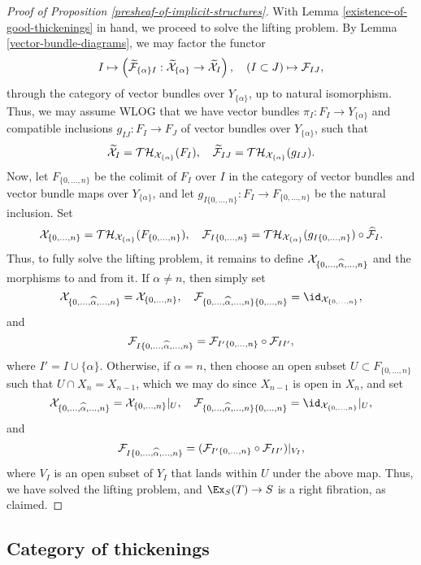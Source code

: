 \begin{proof}[Proof of Proposition \ref{presheaf-of-implicit-structures}]
With Lemma \ref{existence-of-good-thickenings} in hand, we proceed to solve the lifting problem. By Lemma \ref{vector-bundle-diagrams}, we may factor the functor
\[ I \mapsto \left( \widetilde {\mathcal F}_{\{\alpha\} I}: \widetilde {\mathcal X}_{\{\alpha\}} \to \widetilde {\mathcal X}_I \right), \quad \left( I \subset J \right) \mapsto \mathcal F_{I J}, \]
through the category of vector bundles over $Y_{\{\alpha\}}$, up to natural isomorphism. Thus, we may assume WLOG that we have vector bundles $\pi_I: F_I \to Y_{\{\alpha\}}$ and compatible inclusions $g_{I J} : F_I \to F_J$ of vector bundles over $Y_{\{\alpha\}}$, such that
\[ \widetilde {\mathcal X}_I = {\mathcal T \mathcal H}_{\mathcal X_{\{\alpha\}}}(F_I), \quad  \widetilde {\mathcal F}_{IJ} = {\mathcal T \mathcal H}_{\mathcal X_{\{\alpha\}}}(g_{IJ}). \]
Now, let $F_{\{0, \dots, n\}}$ be the colimit of $F_I$ over $I$ in the category of vector bundles and vector bundle maps over $Y_{\{\alpha\}}$, and let $g_{I\{0, \dots, n\}}: F_I \to F_{\{0, \dots, n\}}$ be the natural inclusion. Set
\[ \mathcal X_{\{0, \dots, n\}} = {\mathcal T \mathcal H}_{\mathcal X_{\{\alpha\}}}(F_{\{0, \dots, n\}}), \quad \mathcal F_{I \{0, \dots, n\}} = {\mathcal T \mathcal H}_{\mathcal X_{\{\alpha\}}}(g_{I \{0, \dots, n\}}) \circ \widehat {\mathcal F}_{I}. \]
Thus, to fully solve the lifting problem, it remains to define $\mathcal X_{\{0, \dots, \widehat \alpha, \dots, n\}}$ and the morphisms to and from it. If $\alpha \neq n$, then simply set
\[ \cX_{\{0, \dots, \wh \alpha, \dots, n\}} = \cX_{\{0, \dots, n\}}, \quad \cF_{\{0, \dots, \wh \alpha, \dots, n\} \{0, \dots, n\}} = \id_{\cX_{\{0, \dots, n\}}},\]
and
\[\mathcal F_{I \{0, \dots, \widehat \alpha, \dots, n\}} = \mathcal F_{I' \{0, \dots, n\}} \circ \mathcal F_{I I'},\]
where $I' = I \cup \{\alpha\}$. Otherwise, if $\alpha = n$, then choose an open subset $U \subset F_{\{0, \dots, n\}}$ such that $U \cap X_n = X_{n-1}$, which we may do since $X_{n-1}$ is open in $X_n$, and set
\[ \cX_{\{0, \dots, \wh \alpha, \dots, n\}} = \rest{\cX_{\{0, \dots, n\}}}{U}, \quad \cF_{\{0, \dots, \wh \alpha, \dots, n\} \{0, \dots, n\}} = \rest{\id_{\cX_{\{0, \dots, n\}}}}{U},\]
and
\[\mathcal F_{I \{0, \dots, \widehat \alpha, \dots, n\}} = {(\mathcal F_{I' \{0, \dots, n\}} \circ \mathcal F_{I I'})|_{V_I}},\]
where $V_I$ is an open subset of $Y_I$ that lands within $U$ under the above map. Thus, we have solved the lifting problem, and $\Ex_S(T) \to S$ is a right fibration, as claimed.

\end{proof}

\subsection{Category of thickenings}


